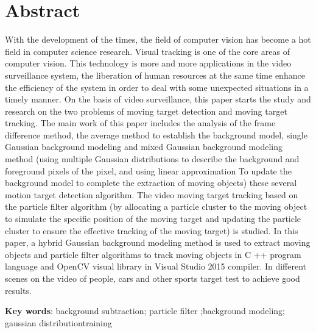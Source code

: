 \documentclass[UTF8, twoside]{ctexart}
\begin{document}
\section*{\arialfont\bfseries Abstract}
\titlespacing*{\section}{0pt}{0pt}{34pt}
\vspace*{0.2cm}
With the development of the times, the field of computer vision has become a hot field in computer science research. Visual tracking is one of the core areas of computer vision. This technology is more and more applications in the video surveillance system, the liberation of human resources at the same time enhance the efficiency of the system in order to deal with some unexpected situations in a timely manner.
On the basis of video surveillance, this paper starts the study and research on the two problems of moving target detection and moving target tracking. The main work of this paper includes the analysis of the frame difference method, the average method to establish the background model, single Gaussian background modeling and mixed Gaussian background modeling method (using multiple Gaussian distributions to describe the background and foreground pixels of the pixel, and using linear approximation To update the background model to complete the extraction of moving objects) these several motion target detection algorithm. The video moving target tracking based on the particle filter algorithm (by allocating a particle cluster to the moving object to simulate the specific position of the moving target and updating the particle cluster to ensure the effective tracking of the moving target) is studied.
In this paper, a hybrid Gaussian background modeling method is used to extract moving objects and particle filter algorithms to track moving objects in C ++ program language and OpenCV visual library in Visual Studio 2015 compiler. In different scenes on the video of people, cars and other sports target test to achieve good results.

\vspace{1.4em}
\noindent\textbf{Key words}: background subtraction; particle filter ;background modeling; gaussian distributiontraining
\newpage\cleardoublepage

\tableofcontents
\newpage

\vspace*{3pt}
\end{document}
